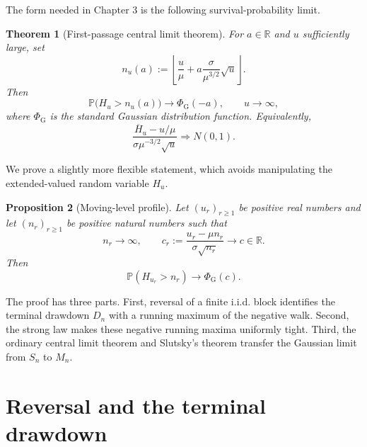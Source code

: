 \documentclass[10pt,reqno,a4paper]{amsart}
\numberwithin{equation}{section}
\theoremstyle{plain}
\newtheorem{theorem}{Theorem}[section]
\newtheorem{proposition}[theorem]{Proposition}
\theoremstyle{definition}
\theoremstyle{remark}
\newcommand{\R}{\mathbb{R}}
\newcommand{\Pp}{\mathbb{P}}
\newcommand{\1}{\mathbf{1}}
\newcommand{\ind}{\Rightarrow}
\begin{document}
The form needed in Chapter 3 is the following survival-probability limit.

\begin{theorem}[First-passage central limit theorem]
\label{thm:first-passage-clt}
  For $a\in\R$ and $u$ sufficiently large, set
  \begin{equation}\label{eq:canonical-time}
    n_u(a)
    :=
    \left\lfloor
      \frac{u}{\mu}
      +a\frac{\sigma}{\mu^{3/2}}\sqrt{u}
    \right\rfloor.
  \end{equation}
  Then
  \begin{equation}\label{eq:first-passage-profile}
    \Pp\bigl(H_u>n_u(a)\bigr)
    \longrightarrow
    \Phi_{\mathrm G}(-a),
    \qquad u\longrightarrow\infty,
  \end{equation}
  where $\Phi_{\mathrm G}$ is the standard Gaussian distribution function.
  Equivalently,
  \begin{equation}\label{eq:first-passage-distribution}
    \frac{\overline H_u-u/\mu}
    {\sigma\mu^{-3/2}\sqrt{u}}
    \ind N(0,1).
  \end{equation}
\end{theorem}

We prove a slightly more flexible statement, which avoids manipulating the
extended-valued random variable $H_u$.

\begin{proposition}[Moving-level profile]\label{prop:moving-level-profile}
  Let $(u_r)_{r\geq1}$ be positive real numbers and let
  $(n_r)_{r\geq1}$ be positive natural numbers such that
  \begin{equation}\label{eq:moving-level-assumptions}
    n_r\longrightarrow\infty,
    \qquad
    c_r:=\frac{u_r-\mu n_r}{\sigma\sqrt{n_r}}
    \longrightarrow c\in\R.
  \end{equation}
  Then
  \begin{equation}\label{eq:moving-level-conclusion}
    \Pp(H_{u_r}>n_r)
    \longrightarrow
    \Phi_{\mathrm G}(c).
  \end{equation}
\end{proposition}

The proof has three parts.  First, reversal of a finite i.i.d. block
identifies the terminal drawdown $D_n$ with a running maximum of the
negative walk.  Second, the strong law makes these negative running maxima
uniformly tight.  Third, the ordinary central limit theorem and Slutsky's
theorem transfer the Gaussian limit from $S_n$ to $M_n$.

\section{Reversal and the terminal drawdown}\label{sec:drawdown}
\end{document}
